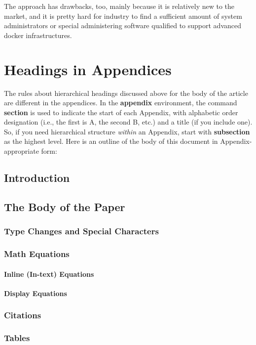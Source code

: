 The approach has drawbacks, too, mainly
because it is relatively new to the market,
and it is pretty hard for industry to find
a sufficient amount of system administrators or special
administering software qualified to support advanced docker infrastructures.



\appendix
\section{Headings in Appendices}
The rules about hierarchical headings discussed above for
the body of the article are different in the appendices.
In the \textbf{appendix} environment, the command
\textbf{section} is used to
indicate the start of each Appendix, with alphabetic order
designation (i.e., the first is A, the second B, etc.) and
a title (if you include one).  So, if you need
hierarchical structure
\textit{within} an Appendix, start with \textbf{subsection} as the
highest level. Here is an outline of the body of this
document in Appendix-appropriate form:
\subsection{Introduction}
\subsection{The Body of the Paper}
\subsubsection{Type Changes and  Special Characters}
\subsubsection{Math Equations}
\paragraph{Inline (In-text) Equations}
\paragraph{Display Equations}
\subsubsection{Citations}
\subsubsection{Tables}
